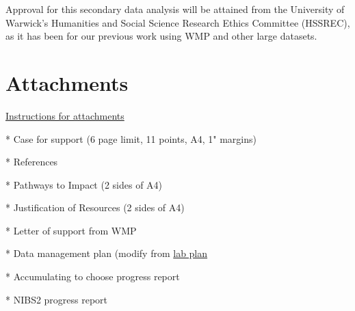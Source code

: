 \documentclass[11pt, a4paper]{article}
\begin{document}
Approval for this secondary data analysis will be attained from the University of Warwick's Humanities and Social Science Research Ethics Committee (HSSREC), as it has been for our previous work using WMP and other large datasets.




\section{Attachments}

\href{https://je-s.rcuk.ac.uk/Handbook/Index.htm#pages/GuidanceonCompletingaStandardG/CaseforSupportandAttachments/ESRCSpecificRequirements.htm}{Instructions for attachments}

* Case for support (6 page limit, 11 points, A4, 1" margins) 

* References

* Pathways to Impact (2 sides of A4) 

* Justification of Resources (2 sides of A4)

* Letter of support from WMP

* Data management plan (modify from \href{https://github.com/neil-stewart/data_management_plan}{lab plan}


* Accumulating to choose progress report

* NIBS2 progress report



\newpage



\end{document}
